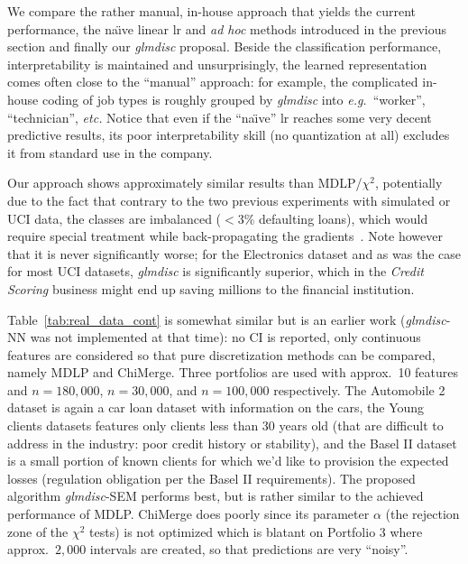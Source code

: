 We compare the rather manual, in-house approach that yields the current performance, the na\"{\i}ve linear \gls{lr} and \textit{ad hoc} methods introduced in the previous section and finally our \textit{glmdisc} proposal. Beside the classification performance, interpretability is maintained and unsurprisingly, the learned representation comes often close to the ``manual'' approach: for example, the complicated in-house coding of job types is roughly grouped by \textit{glmdisc} into \textit{e.g.}\ ``worker'', ``technician'', \textit{etc.} Notice that even if the ``na\"{\i}ve'' \gls{lr} reaches some very decent predictive results, its poor interpretability skill (no quantization at all) excludes it from standard use in the company.

Our approach shows approximately similar results than MDLP/$\chi^2$, potentially due to the fact that contrary to the two previous experiments with simulated or UCI data, the classes are imbalanced ($< 3 \%$ defaulting loans), which would require special treatment while back-propagating the gradients~\cite{anand1993improved}. Note however that it is never significantly worse; for the Electronics dataset and as was the case for most UCI datasets, \textit{glmdisc} is significantly superior, which in the \textit{Credit Scoring} business might end up saving millions to the financial institution.

Table~\ref{tab:real_data_cont} is somewhat similar but is an earlier work (\textit{glmdisc}-NN was not implemented at that time): no CI is reported, only continuous features are considered so that pure discretization methods can be compared, namely MDLP and ChiMerge. Three portfolios are used with approx.\ 10 features and $n = 180{,}000$, $n = 30{,}000$, and $n = 100{,}000$ respectively. The Automobile 2 dataset is again a car loan dataset with information on the cars, the Young clients datasets features only clients less than 30 years old (that are difficult to address in the industry: poor credit history or stability), and the Basel II dataset is a small portion of known clients for which we'd like to provision the expected losses (regulation obligation per the Basel II requirements). The proposed algorithm \textit{glmdisc}-SEM performs best, but is rather similar to the achieved performance of MDLP. ChiMerge does poorly since its parameter $\alpha$ (the rejection zone of the $\chi^2$ tests) is not optimized which is blatant on Portfolio 3 where approx.\ $2{,}000$ intervals are created, so that predictions are very ``noisy''.


